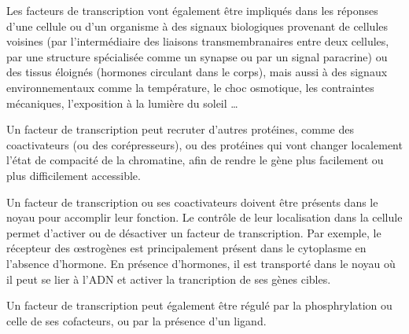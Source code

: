 Les facteurs de transcription vont également être impliqués dans les réponses d'une cellule ou d'un organisme à des signaux biologiques provenant de cellules voisines (par l'intermédiaire des liaisons transmembranaires entre deux cellules, par une structure spécialisée comme un synapse ou par un signal paracrine) ou des tissus éloignés (hormones circulant dans le corps), mais aussi à des signaux environnementaux comme la température, le choc osmotique, les contraintes mécaniques, l'exposition à la lumière du soleil  \dots


Un facteur de transcription peut recruter d'autres protéines, comme des coactivateurs (ou des corépresseurs), ou des protéines qui vont changer localement l'état de compacité de la chromatine, afin de rendre le gène plus facilement ou plus difficilement accessible. 

Un facteur de transcription ou ses coactivateurs doivent être présents dans le noyau pour accomplir leur fonction. Le contrôle de leur localisation dans la cellule permet d'activer ou de désactiver un facteur de transcription. Par exemple, le récepteur des \oe strogènes est principalement présent dans le cytoplasme en l'absence d'hormone. En présence d'hormones, il est transporté dans le noyau où il peut se lier à l'ADN et activer la trancription de ses gènes cibles. 


Un facteur de transcription peut également être régulé par la phosphrylation ou celle de ses cofacteurs, ou par la présence d'un ligand. 


%